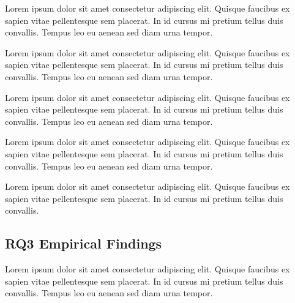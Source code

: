\documentclass[sigconf,nonacm]{acmart} %
\begin{document}
Lorem ipsum dolor sit amet consectetur adipiscing elit.
Quisque faucibus ex sapien vitae pellentesque sem placerat. 
In id cursus mi pretium tellus duis convallis. 
Tempus leo eu aenean sed diam urna tempor.

Lorem ipsum dolor sit amet consectetur adipiscing elit.
Quisque faucibus ex sapien vitae pellentesque sem placerat. 
In id cursus mi pretium tellus duis convallis. 
Tempus leo eu aenean sed diam urna tempor. 

Lorem ipsum dolor sit amet consectetur adipiscing elit.
Quisque faucibus ex sapien vitae pellentesque sem placerat. 
In id cursus mi pretium tellus duis convallis. 
Tempus leo eu aenean sed diam urna tempor.

Lorem ipsum dolor sit amet consectetur adipiscing elit.
Quisque faucibus ex sapien vitae pellentesque sem placerat. 
In id cursus mi pretium tellus duis convallis. 
Tempus leo eu aenean sed diam urna tempor.

Lorem ipsum dolor sit amet consectetur adipiscing elit.
Quisque faucibus ex sapien vitae pellentesque sem placerat. 
In id cursus mi pretium tellus duis convallis. 

\subsection{RQ3 Empirical Findings}
\label{subsec:rq3_findings}

Lorem ipsum dolor sit amet consectetur adipiscing elit.
Quisque faucibus ex sapien vitae pellentesque sem placerat. 
In id cursus mi pretium tellus duis convallis. 
Tempus leo eu aenean sed diam urna tempor.
\end{document}
